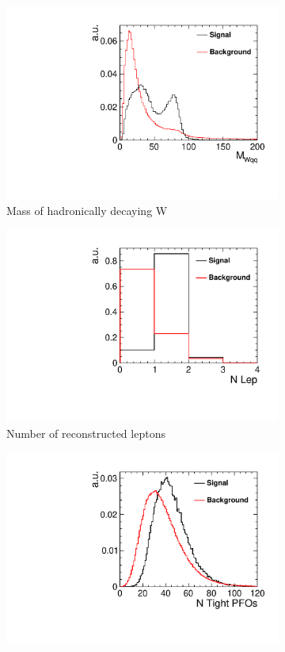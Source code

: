 \begin{figure}[]\ContinuedFloat 
   \begin{subfigure}[]{0.5\linewidth}
    \centering
    \includegraphics[width=0.75\linewidth]{Appendix/figures/MWqq} 
    \caption{Mass of hadronically decaying W} 
    \vspace{4ex}
  \end{subfigure}%
  \begin{subfigure}[]{0.5\linewidth}
    \centering
    \includegraphics[width=0.75\linewidth]{Appendix/figures/nLep} 
    \caption{Number of reconstructed leptons} 
    \vspace{4ex}
  \end{subfigure}
  \begin{subfigure}[]{0.5\linewidth}
    \centering
    \includegraphics[width=0.75\linewidth]{Appendix/figures/NTightPFOs} 

\end{subfigure}
\end{figure}
